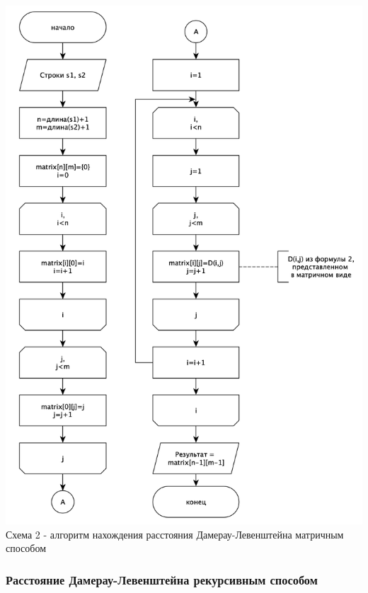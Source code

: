 \documentclass[a4paper,14pt]{article} %
\begin{document}
        \begin{center}
        		\includegraphics[scale = 0.8]{shema2} \\ Схема  2 - алгоритм нахождения расстояния Дамерау-Левенштейна матричным способом
	\end{center}
	
	\subsubsection{Расстояние Дамерау-Левенштейна рекурсивным способом}
	
\end{document}
